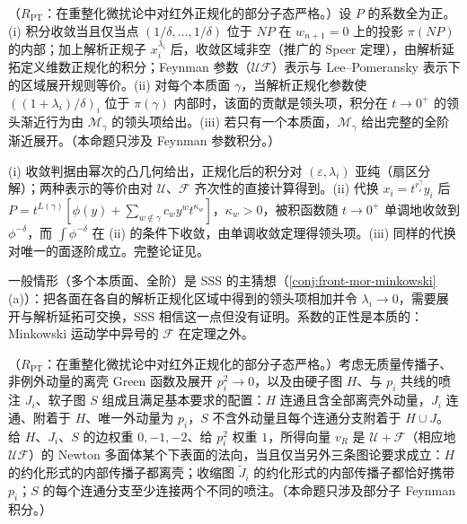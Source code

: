 \begin{proposition}\label{prop:front-lp-facets}
（$R_{\mathrm{PT}}$：在重整化微扰论中对红外正规化的部分子态严格。）设 $P$ 的系数全为正。(i) 积分收敛当且仅当点 $(1/\delta,\dots,1/\delta)$ 位于 $NP$ 在 $w_{n+1}=0$ 上的投影 $\pi(NP)$ 的内部；加上解析正规子 $x_i^{\lambda_i}$ 后，收敛区域非空（推广的 Speer 定理），由解析延拓定义维数正规化的积分；Feynman 参数（$\mathcal U\mathcal F$）表示与 Lee--Pomeransky 表示下的区域展开规则等价。(ii) 对每个本质面 $\gamma$，当解析正规化参数使 $((1+\lambda_i)/\delta)_i$ 位于 $\pi(\gamma)$ 内部时，该面的贡献是领头项，积分在 $t\to0^+$ 的领头渐近行为由 $\mathcal M_\gamma$ 的领头项给出。(iii) 若只有一个本质面，$\mathcal M_\gamma$ 给出完整的全阶渐近展开。（本命题只涉及 Feynman 参数积分。）
\end{proposition}

\begin{proofsketch}
(i) 收敛判据由幂次的凸几何给出，正规化后的积分对 $(\varepsilon,\lambda_i)$ 亚纯（扇区分解）；两种表示的等价由对 $\mathcal U$、$\mathcal F$ 齐次性的直接计算得到。(ii) 代换 $x_i=t^{r^\gamma_i}y_i$ 后 $P=t^{L(\gamma)}[\phi(y)+\sum_{w\notin\gamma}c_wy^wt^{\kappa_w}]$，$\kappa_w>0$，被积函数随 $t\to0^+$ 单调地收敛到 $\phi^{-\delta}$，而 $\int\phi^{-\delta}$ 在 (ii) 的条件下收敛，由单调收敛定理得领头项。(iii) 同样的代换对唯一的面逐阶成立。完整论证见\cite[第~4--7~节]{Semenova:2018cwy}。
\end{proofsketch}

\noindent 一般情形（多个本质面、全阶）是 SSS 的主猜想（\cref{conj:front-mor-minkowski}(a)）：把各面在各自的解析正规化区域中得到的领头项相加并令 $\lambda_i\to0$，需要展开与解析延拓可交换，SSS 相信这一点但没有证明\cite[第~6~节]{Semenova:2018cwy}。系数的正性是本质的：Minkowski 运动学中异号的 $\mathcal F$ 在定理之外。

\begin{proposition}[宽角 Green 函数在壳展开：区域 $=$ Landau 解 $=$ 面 \tagR]\label{prop:front-onshell-facets}
（$R_{\mathrm{PT}}$：在重整化微扰论中对红外正规化的部分子态严格。）考虑无质量传播子、非例外动量的离壳 Green 函数及展开 $p_i^2\to0$，以及由硬子图 $H$、与 $p_i$ 共线的喷注 $J_i$、软子图 $S$ 组成且满足基本要求的配置：$H$ 连通且含全部离壳外动量，$J_i$ 连通、附着于 $H$、唯一外动量为 $p_i$，$S$ 不含外动量且每个连通分支附着于 $H\cup J$。给 $H$、$J_i$、$S$ 的边权重 $0,-1,-2$、给 $p_i^2$ 权重 $1$，所得向量 $v_R$ 是 $\mathcal U+\mathcal F$（相应地 $\mathcal U\mathcal F$）的 Newton 多面体某个下表面的法向，当且仅当另外三条图论要求成立：$H$ 的约化形式的内部传播子都离壳；收缩图 $\tilde J_i$ 的约化形式的内部传播子都恰好携带 $p_i$；$S$ 的每个连通分支至少连接两个不同的喷注\cite[第~3.3~节，附录~C]{Gardi:2022khw}。（本命题只涉及部分子 Feynman 积分。）
\end{proposition}

